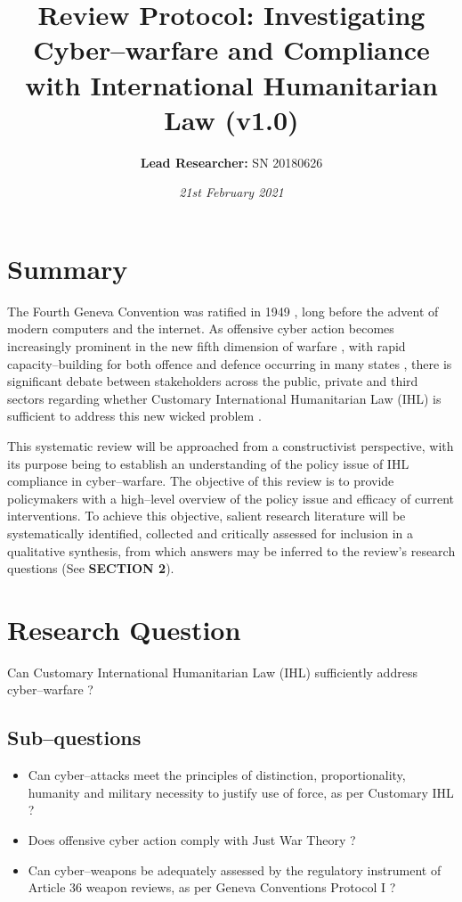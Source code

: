 \documentclass[british]{article}
\begin{document}
\title{\textbf{Review Protocol: Investigating Cyber--warfare and Compliance
with International Humanitarian Law (v1.0)}}
\date{\emph{21st February 2021}}
\author{\textbf{Lead Researcher: }SN 20180626}
\maketitle

\section{Summary}

The Fourth Geneva Convention was ratified in 1949 \cite{pictet1952geneva},
long before the advent of modern computers and the internet. As offensive
cyber action becomes increasingly prominent in the new \textquotedbl fifth
dimension\textquotedbl{} of warfare \cite{manson2011cyberwar}, with
rapid capacity--building for both offence and defence occurring in
many states \cite{manson2011cyberwar}, there is significant debate
between stakeholders across the public, private and third sectors
regarding whether Customary International Humanitarian Law (IHL) \cite{drmann2005customary}
is sufficient to address this new \textquotedbl wicked problem\textquotedbl{}
\cite{lin2012cyber}. 

This systematic review will be approached from a constructivist perspective,
with its purpose being to establish an understanding of the policy
issue of IHL compliance in cyber--warfare. The objective of this
review is to provide policymakers with a high--level overview of
the policy issue and efficacy of current interventions. To achieve
this objective, salient research literature will be systematically
identified, collected and critically assessed for inclusion in a qualitative
synthesis, from which answers may be inferred to the review's research
questions (See \textbf{SECTION 2}).

\section{Research Question}

Can Customary International Humanitarian Law (IHL) sufficiently address
cyber--warfare \cite{lin2012cyber}? 

\subsection{Sub--questions}
\begin{itemize}
\item Can cyber--attacks meet the principles of distinction, proportionality,
humanity and military necessity to justify use of force, as per Customary
IHL \cite{drmann2005customary}? 
\item Does offensive cyber action comply with Just War Theory \cite{eberle2013just}?
\item Can cyber--weapons be adequately assessed by the regulatory instrument
of Article 36 weapon reviews, as per Geneva Conventions Protocol I
\cite{international1987protocol}? 
\end{itemize}
\end{document}
